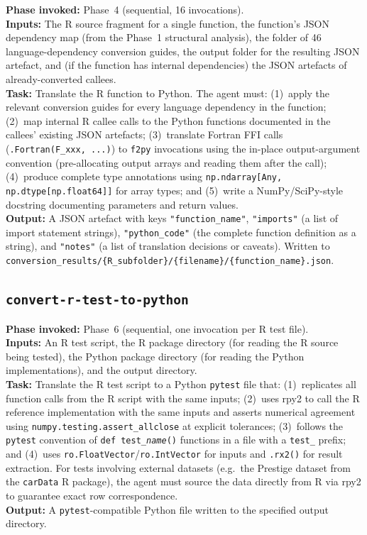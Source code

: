 \documentclass[12pt,a4paper]{article}
\newcommand{\pkg}[1]{\texttt{#1}}
\begin{document}
\textbf{Phase invoked:} Phase~4 (sequential, 16 invocations).\\
\textbf{Inputs:} The R source fragment for a single function, the function's JSON dependency map (from the Phase~1 structural analysis), the folder of 46 language-dependency conversion guides, the output folder for the resulting JSON artefact, and (if the function has internal dependencies) the JSON artefacts of already-converted callees.\\
\textbf{Task:} Translate the R function to Python. The agent must: (1)~apply the relevant conversion guides for every language dependency in the function; (2)~map internal R callee calls to the Python functions documented in the callees' existing JSON artefacts; (3)~translate Fortran FFI calls (\texttt{.Fortran(F\_xxx, ...)}) to \pkg{f2py} invocations using the in-place output-argument convention (pre-allocating output arrays and reading them after the call); (4)~produce complete type annotations using \texttt{np.ndarray[Any, np.dtype[np.float64]]} for array types; and (5)~write a NumPy/SciPy-style docstring documenting parameters and return values.\\
\textbf{Output:} A JSON artefact with keys \texttt{"function\_name"}, \texttt{"imports"} (a list of import statement strings), \texttt{"python\_code"} (the complete function definition as a string), and \texttt{"notes"} (a list of translation decisions or caveats). Written to \texttt{conversion\_results/\{R\_subfolder\}/\{filename\}/\{function\_name\}.json}.

\subsection{\texttt{convert-r-test-to-python}}
\label{supp:agent-convert-test}

\textbf{Phase invoked:} Phase~6 (sequential, one invocation per R test file).\\
\textbf{Inputs:} An R test script, the R package directory (for reading the R source being tested), the Python package directory (for reading the Python implementations), and the output directory.\\
\textbf{Task:} Translate the R test script to a Python \texttt{pytest} file that: (1)~replicates all function calls from the R script with the same inputs; (2)~uses rpy2 to call the R reference implementation with the same inputs and asserts numerical agreement using \texttt{numpy.testing.assert\_allclose} at explicit tolerances; (3)~follows the \texttt{pytest} convention of \texttt{def test\_\textit{name}()} functions in a file with a \texttt{test\_} prefix; and (4)~uses \texttt{ro.FloatVector}/\texttt{ro.IntVector} for inputs and \texttt{.rx2()} for result extraction. For tests involving external datasets (e.g.\ the Prestige dataset from the \texttt{carData} R package), the agent must source the data directly from R via rpy2 to guarantee exact row correspondence.\\
\textbf{Output:} A \texttt{pytest}-compatible Python file written to the specified output directory.
\end{document}
